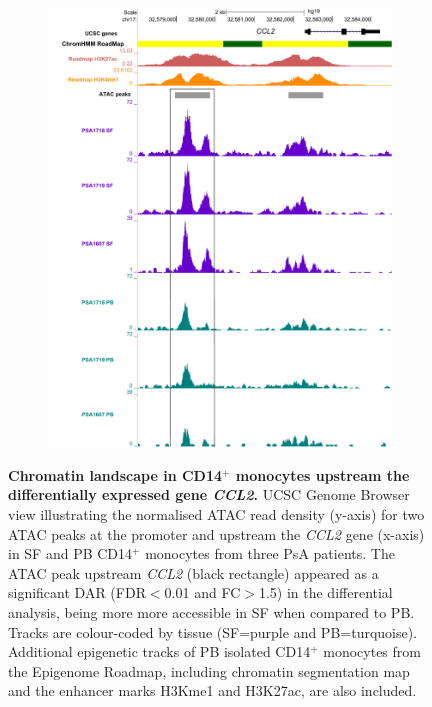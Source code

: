 \bigskip
\begin{figure}[H]
\centering
\begin{subfigure}[b]{0.55\textwidth}
\centering 
\includegraphics[width=\textwidth]{./Results3/pdfs/ATAC_PSA_CD14_UCSC_CCL2_track}
\caption{}
\end{subfigure}
\caption[Chromatin landscape in CD14$^+$ monocytes upstream the differentially expressed gene \textit{CCL2}.]{\textbf{Chromatin landscape in CD14$^+$ monocytes upstream the differentially expressed gene \textit{CCL2}.} UCSC Genome Browser view illustrating the normalised ATAC read density (y-axis) for two ATAC peaks at the promoter and upstream the \textit{CCL2} gene (x-axis) in SF and PB CD14$^+$ monocytes from three PsA patients. The ATAC peak upstream \textit{CCL2} (black rectangle) appeared as a significant DAR (FDR$<$0.01 and FC$>$1.5) in the differential analysis, being more more accessible in SF when compared to PB. Tracks are colour-coded by tissue (SF=purple and PB=turquoise). Additional epigenetic tracks of PB isolated CD14$^+$ monocytes from the Epigenome Roadmap, including chromatin segmentation map and the enhancer marks H3Kme1 and H3K27ac, are also included.}
\label{figure:PsA_10X_qPCR_ATAC_CD14_CCL2}
\end{figure}



